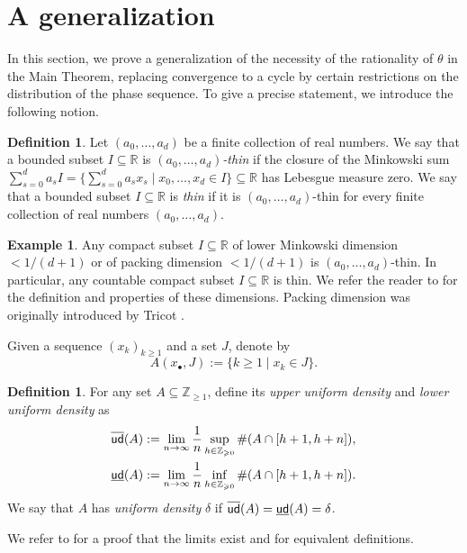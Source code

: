 \documentclass[12pt,centertags,oneside]{amsart}
\theoremstyle{definition}
\newtheorem{defn}[theorem]{Definition}
\newtheorem{definition}[theorem]{Definition}
\newtheorem{example}[theorem]{Example}
\newcommand{\R}{\mathbb{R}}
\newcommand{\Z}{\mathbb{Z}}
\newcommand{\lden}{\underline{\sf ud}}
\newcommand{\uden}{\overline{\sf ud}}
\renewcommand{\ge}{\geqslant}
\begin{document}
\section{A generalization}\label{s:3}

In this section, we prove a generalization of the necessity of the 
rationality of $\theta$ in the Main Theorem, replacing convergence to a cycle 
by certain restrictions on the distribution of the phase sequence. To give a 
precise statement, we introduce the following notion. 

\begin{defn}\label{d:thin}
Let $(a_0,\dots,a_d)$ be a finite collection of real numbers. We say that a 
bounded subset $I\subseteq \R$ is \emph{$(a_0,\dots,a_d)$-thin} if the 
closure of the Minkowski sum $\sum_{s=0}^d a_s I=\{\sum_{s=0}^d a_s x_s\mid 
x_0,\dots,x_d\in I\}\subseteq \R$ has Lebesgue measure zero. We say that a 
bounded subset $I\subseteq \R$ is \emph{thin} if it is $(a_0,\dots,a_d)$-thin 
for every  finite collection of real numbers $(a_0,\dots,a_d)$.
\end{defn}

\begin{example}\label{ex:thin}
Any compact subset $I\subseteq \R$ of lower Minkowski dimension $<1/(d+1)$ 
or of packing dimension $<1/(d+1)$ is $(a_0,\dots,a_d)$-thin. In 
particular, any countable compact subset $I\subseteq\R$ is thin. We refer 
the reader to \cite{Falconer} for the definition and properties of these 
dimensions. Packing dimension was originally introduced by Tricot 
\cite{Tricot}. 
\end{example}

Given a sequence $(x_k)_{k\geqslant 1}$ and a set $J$, denote by 
\[
A(x_\bullet,J):=\{k\geqslant 1\mid x_k\in J\}.
\]

\begin{definition}
For any set $A\subseteq \mathbb{Z}_{\geqslant 1}$, define its {\em upper 
uniform density} and {\em lower uniform density} as 
\begin{align*}
\uden(A)&:=\lim_{n\to \infty}\frac{1}{n}\sup_{h\in \Z_{\ge 0}}\#(A\cap [h+1,h+n]),\\
\lden(A)&:=\lim_{n\to \infty}\frac{1}{n}\inf_{h\in \Z_{\ge 0}}\#(A\cap [h+1,h+n]).
\end{align*}
We say that $A$ has \emph{uniform density} $\delta$ if  
$\uden(A)=\lden(A)=\delta$. 
\end{definition}

We refer to \cite{GTT} for a proof that the limits exist and for equivalent 
definitions. 
\end{document}
